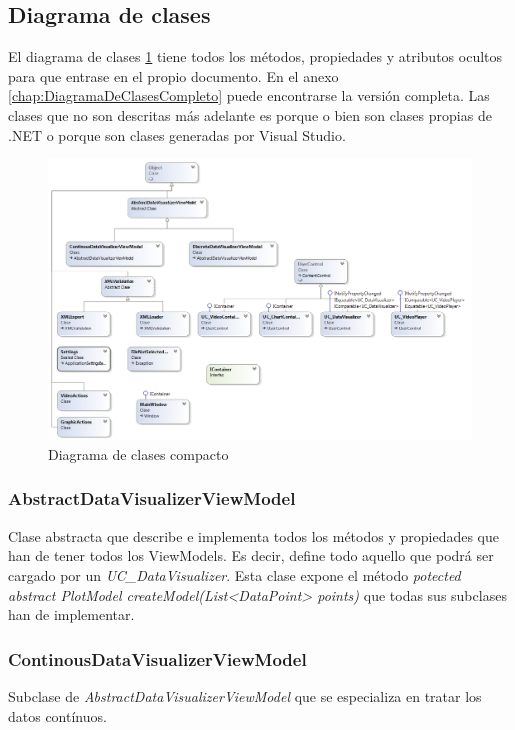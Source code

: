 \subsection{Diagrama de clases}
El diagrama de clases \ref{fig:ClassDiagram} tiene todos los m\'etodos, propiedades y atributos ocultos para que entrase
en el propio documento. En el anexo \ref{chap:DiagramaDeClasesCompleto} puede encontrarse la versi\'on completa. Las clases que no son descritas m\'as adelante es porque o bien
son clases propias de .NET o porque son clases generadas por Visual Studio.

\begin{figure}[H]
	\centering
	\includegraphics[width=1.2\linewidth]{./Figures/ClassDiagram}
	\caption[Diagrama de clases compacto]{Diagrama de clases compacto}
	\label{fig:ClassDiagram}
\end{figure}

\subsubsection{AbstractDataVisualizerViewModel}
Clase abstracta que describe e implementa todos los m\'etodos y propiedades que han de tener todos los ViewModels. Es decir,
define todo aquello que podr\'a ser cargado por un \emph{UC\_DataVisualizer}. Esta clase expone el m\'etodo
\emph{potected abstract PlotModel createModel(List<DataPoint> points)}
que todas sus subclases han de implementar.

\subsubsection{ContinousDataVisualizerViewModel}
Subclase de \emph{AbstractDataVisualizerViewModel} que se especializa en tratar los datos cont\'inuos. 

